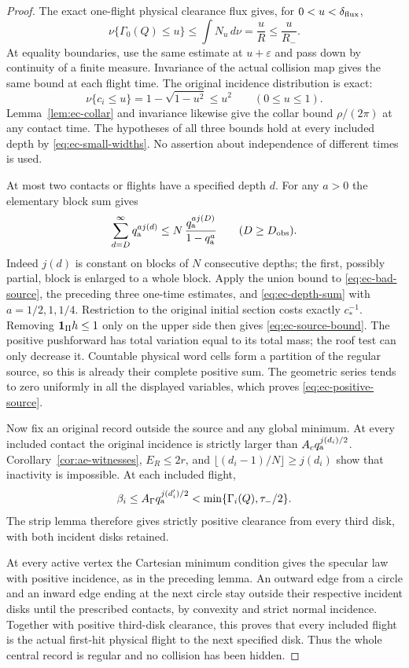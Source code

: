 \begin{proof}
The exact one-flight physical clearance flux gives, for
$0<u<\delta_{\rm flux}$,
\[
 \nu\{\Gamma_0(Q)\le u\}
 \le\int N_u\,d\nu=\frac uR\le\frac u{R_-}.
\]
At equality boundaries, use the same estimate at $u+\varepsilon$
and pass down by continuity of a finite measure.  Invariance of the
actual collision map gives the same bound at each flight time.
The original incidence distribution is exact:
\[
 \nu\{c_i\le u\}
   =1-\sqrt{1-u^2}\le u^2\qquad(0\le u\le1).
\]
Lemma~\ref{lem:ec-collar} and invariance likewise give the collar
bound $\rho/(2\pi)$ at any contact time.  The hypotheses of all
three bounds hold at every included depth by
\eqref{eq:ec-small-widths}.  No assertion about independence of
different times is used.

At most two contacts or flights have a specified depth $d$.  For
any $a>0$ the elementary block sum gives
\begin{equation}\label{eq:ec-depth-sum}
 \sum_{d=D}^\infty q_{\rm a}^{a j(d)}
 \le N\,\frac{q_{\rm a}^{a j(D)}}{1-q_{\rm a}^{a}}
                         \qquad(D\ge D_{\rm obs}).
\end{equation}
Indeed $j(d)$ is constant on blocks of $N$ consecutive depths;
the first, possibly partial, block is enlarged to a whole block.
Apply the union bound to \eqref{eq:ec-bad-source}, the preceding
three one-time estimates, and \eqref{eq:ec-depth-sum} with
$a=1/2,1,1/4$.  Restriction to the original initial section costs
exactly $c_*^{-1}$.  Removing $\mathbf1_\Pi h\le1$ only on the upper
side then gives \eqref{eq:ec-source-bound}.  The positive
pushforward has total variation equal to its total mass; the roof
test can only decrease it.  Countable physical word cells form a
partition of the regular source, so this is already their complete
positive sum.  The geometric series tends to zero uniformly in all
the displayed variables, which proves \eqref{eq:ec-positive-source}.

Now fix an original record outside the source and any global
minimum.  At every included contact the original incidence is
strictly larger than $A_cq_{\rm a}^{j(d_i)/2}$.
Corollary~\ref{cor:ae-witnesses}, $E_R\le2r$, and
$\lfloor(d_i-1)/N\rfloor\ge j(d_i)$ show that inactivity is
impossible.  At each included flight,
\[
 \beta_i\le A_\Gamma q_{\rm a}^{j(d'_i)/2}
                  <\min\{\Gamma_i(Q),\tau_-/2\}.
\]
The strip lemma therefore gives strictly positive clearance from
every third disk, with both incident disks retained.

At every active vertex the Cartesian minimum condition gives the
specular law with positive incidence, as in the preceding lemma.
An outward edge from a circle and an inward edge ending at the next
circle stay outside their respective incident disks until the
prescribed contacts, by convexity and strict normal incidence.
Together with positive third-disk clearance, this proves that every
included flight is the actual first-hit physical flight to the next
specified disk.  Thus the whole central record is regular and no
collision has been hidden.


\end{proof}
